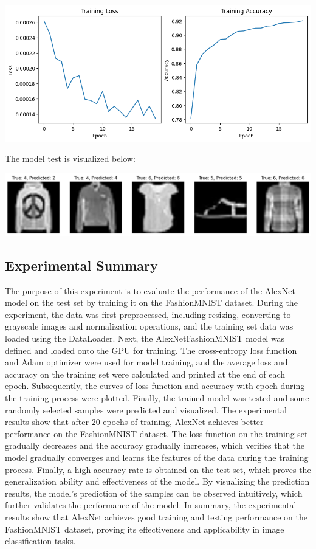 \documentclass[a4paper,12pt]{article}
\begin{document}
\centering %
\includegraphics[width=0.8\linewidth]{images/lab2_5_loss.png}

\justifying


The model test is visualized below:

\centering %
\includegraphics[width=0.8\linewidth]{images/lab2_5_result.png}

\justifying
\subsection{Experimental Summary}
The purpose of this experiment is to evaluate the performance of the AlexNet model on the test set by training it on the FashionMNIST dataset. During the experiment, the data was first preprocessed, including resizing, converting to grayscale images and normalization operations, and the training set data was loaded using the DataLoader. Next, the AlexNetFashionMNIST model was defined and loaded onto the GPU for training. The cross-entropy loss function and Adam optimizer were used for model training, and the average loss and accuracy on the training set were calculated and printed at the end of each epoch. Subsequently, the curves of loss function and accuracy with epoch during the training process were plotted. Finally, the trained model was tested and some randomly selected samples were predicted and visualized. The experimental results show that after 20 epochs of training, AlexNet achieves better performance on the FashionMNIST dataset. The loss function on the training set gradually decreases and the accuracy gradually increases, which verifies that the model gradually converges and learns the features of the data during the training process. Finally, a high accuracy rate is obtained on the test set, which proves the generalization ability and effectiveness of the model. By visualizing the prediction results, the model's prediction of the samples can be observed intuitively, which further validates the performance of the model. In summary, the experimental results show that AlexNet achieves good training and testing performance on the FashionMNIST dataset, proving its effectiveness and applicability in image classification tasks.
\end{document}
